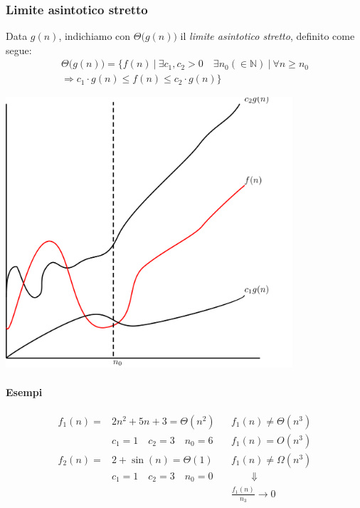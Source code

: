 \subsubsection{Limite asintotico stretto}
Data $g(n)$, indichiamo con $\Theta \big( g(n) \big)$ il \emph{limite asintotico stretto}, definito come segue:
\begin{multline*}
	\Theta \big( g(n) \big) = \{ f(n) \ \vert \ \exists c_1, c_2 > 0 \quad \exists n_0 (\in \mathbb{N}) \ \vert \ \forall n \geq n_0 \\ 
	\Rightarrow c_1 \cdot g(n) \leq f(n) \leq c_2 \cdot g(n) \}
\end{multline*}

\begin{center}
	\includegraphics[width=0.80\textwidth]{img/plots/plottheta.png}
\end{center}

\paragraph{Esempi}
\begin{align*}
	f_1(n) = & 2n^2 + 5n + 3 = \Theta (n^2) && f_1(n) \neq \Theta (n^3) \\
	& c_1 = 1 \quad c_2 = 3 \quad n_0 = 6 && f_1(n) = O(n^3) \\
	f_2(n) = & 2 + \sin (n) = \Theta (1) && f_1(n) \neq \Omega (n^3) \\
	& c_1 = 1 \quad c_2 = 3 \quad n_0 = 0 && \qquad \Downarrow \\
	& && \frac{f_1(n)}{n_3} \rightarrow 0
\end{align*}
\newpage
